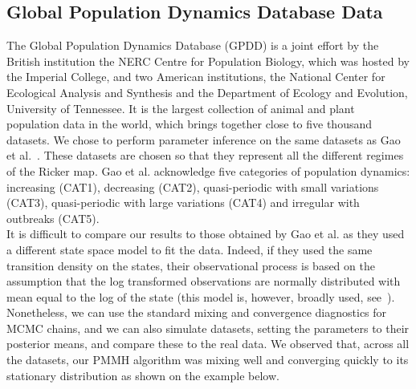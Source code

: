 \documentclass[12pt]{article}
\begin{document}
	\subsection{Global Population Dynamics Database Data}
	The Global Population Dynamics Database (GPDD) is a joint effort by the British institution the NERC Centre for Population Biology, which was hosted by the Imperial College, and two American institutions, the National Center for Ecological Analysis and Synthesis and the Department of Ecology and Evolution, University of Tennessee. It is the largest collection of animal and plant population data in the world, which brings together close to five thousand datasets. We chose to perform parameter inference on the same datasets as Gao et al.~\cite{gao2012bayesian}. These datasets are chosen so that they represent all the different regimes of the Ricker map. Gao et al. acknowledge five categories of population dynamics: increasing (CAT1), decreasing (CAT2), quasi-periodic with small variations (CAT3), quasi-periodic with large variations (CAT4) and irregular with outbreaks (CAT5). \\
	It is difficult to compare our results to those obtained by Gao et al. as they used a different state space model to fit the data. Indeed, if they used the same transition density on the states, their observational process is based on the assumption that the log transformed observations are normally distributed with mean equal to the log of the state (this model is, however, broadly used, see~\cite{de2002fitting, valpine2005state, peters2010ecological}). Nonetheless, we can use the standard mixing and convergence diagnostics for MCMC chains, and  we can also simulate datasets, setting the parameters to their posterior means, and compare these to the real data. We observed that, across all the datasets, our PMMH algorithm was mixing well and converging quickly to its stationary distribution as shown on the example below.
	
\end{document}
